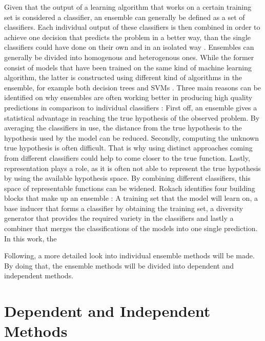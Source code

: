 Given that the output of a learning algorithm that works on a certain training set is considered a classifier, an ensemble can generally be defined as a set of classifiers. Each individual output of these classifiers is then combined in order to achieve one decision that predicts the problem in a better way, than the single classifiers could have done on their own and in an isolated way \cite{dietterich2000}. Ensembles can generally be divided into homogenous and heterogenous ones. While the former consist of models that have been trained on the same kind of machine learning algorithm, the latter is constructed using different kind of algorithms in the ensemble, for example both decision trees and SVMs \cite{zhou2012}. Three main reasons can be identified on why ensembles are often working better in producing high quality predictions in comparison to individual classifiers \cite{dietterich2000}: First off, an ensemble gives a statistical advantage in reaching the true hypothesis of the observed problem. By averaging the classifiers in use, the distance from the true hypothesis to the hypothesis used by the model can be reduced. Secondly, computing the unknown true hypothesis is often difficult. That is why using distinct approaches coming from different classifiers could help to come closer to the true function. Lastly, representation plays a role, as it is often not able to represent the true hypothesis by using the available hypothesis space. By combining different classifiers, this space of representable functions can be widened. Rokach identifies four building blocks that make up an ensemble \cite{rokach2010}: A training set that the model will learn on, a base inducer that forms a classifier by obtaining the training set, a diversity generator that provides the required variety in the classifiers and lastly a combiner that merges the classifications of the models into one single prediction. In this work, the 

Following, a more detailed look into individual ensemble methods will be made. By doing that, the ensemble methods will be divided into dependent and independent methods.  

\section{Dependent and Independent Methods}

